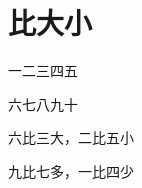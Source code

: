 \documentclass[12pt,UTF-8,openany]{ctexbook}
\begin{document}
\hanzibox{}\hanzibox{}\hanzibox{}\hanzibox{}\hspace{1em}\hanzibox{}\hanzibox{}\hanzibox{}\hanzibox{}

\hanzibox{}\hanzibox{}\hanzibox{}\hanzibox{}\hspace{1em}\hanzibox{}\hanzibox{}\hanzibox{}\hanzibox{}






\chapter{比大小}

\begin{large}
    
    一二三四五
    
    六七八九十
    
    六比三大，二比五小
    
    九比七多，一比四少
    
\end{large}


\clearpage

\begin{center}
    
    
    
\end{center}


\hanzibox{}\hanzibox{}\hanzibox{}\hanzibox{}\hspace{1em}\hanzibox{}\hanzibox{}\hanzibox{}\hanzibox{}

\hanzibox{}\hanzibox{}\hanzibox{}\hanzibox{}\hspace{1em}\hanzibox{}\hanzibox{}\hanzibox{}\hanzibox{}

\hanzibox{}\hanzibox{}\hanzibox{}\hanzibox{}\hspace{1em}\hanzibox{}\hanzibox{}\hanzibox{}\hanzibox{}

\hanzibox{}\hanzibox{}\hanzibox{}\hanzibox{}\hspace{1em}\hanzibox{}\hanzibox{}\hanzibox{}\hanzibox{}

\hanzibox{}\hanzibox{}\hanzibox{}\hanzibox{}\hspace{1em}\hanzibox{}\hanzibox{}\hanzibox{}\hanzibox{}
\end{document}
